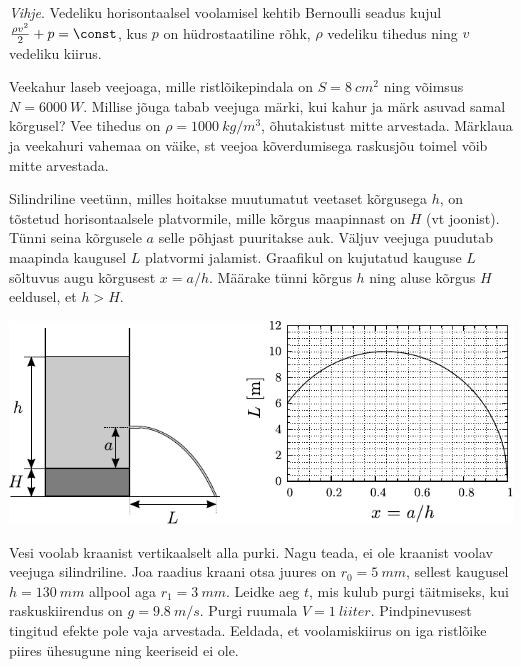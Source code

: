 \documentclass[10pt, twoside]{article}
\begin{document}
{\emph{Vihje}. 
Vedeliku horisontaalsel voolamisel kehtib Bernoulli seadus kujul $\frac{\rho v^2}{2}+p=\const$, kus $p$ on hüdrostaatiline rõhk, $\rho$ vedeliku tihedus ning $v$ vedeliku kiirus.
\probend
\bigskip


Veekahur laseb veejoaga, mille ristlõikepindala on $S = \SI{8}{cm^2}$ ning võimsus $N = \SI{6000}{W}$. Millise jõuga tabab veejuga märki, kui kahur ja märk asuvad samal kõrgusel? Vee tihedus on $\rho = \SI{1000}{kg/m^3}$, õhutakistust mitte arvestada. Märklaua ja veekahuri vahemaa on väike, st veejoa kõverdumisega raskusjõu toimel võib mitte arvestada.
\probend
\bigskip


Silindriline veetünn, milles hoitakse muutumatut veetaset kõrgusega $h$, on tõstetud horisontaalsele platvormile, mille kõrgus maapinnast on $H$ (vt joonist). Tünni seina kõrgusele $a$ selle põhjast puuritakse auk. Väljuv veejuga puudutab maapinda kaugusel $L$ platvormi jalamist. Graafikul on kujutatud kauguse $L$ sõltuvus augu kõrgusest $x = a/h$. Määrake tünni kõrgus $h$ ning aluse kõrgus $H$ eeldusel, et $h > H$.

\begin{center}
	\includegraphics[width=\linewidth]{2005-v3g-05-yl}
\end{center}
\probend
\bigskip


Vesi voolab kraanist vertikaalselt alla purki. Nagu teada, ei ole kraanist voolav veejuga silindriline. Joa raadius kraani otsa juures on $r_0 = \SI{5}{mm}$, sellest kaugusel $h = \SI{130}{mm}$ allpool aga $r_1 = \SI{3}{mm}$. Leidke aeg $t$, mis kulub purgi täitmiseks, kui raskuskiirendus on $g = \SI{9,8}{m/s}$. Purgi ruumala $V = \SI{1}{liiter}$. Pindpinevusest tingitud efekte pole vaja arvestada. Eeldada, et voolamiskiirus on iga ristlõike piires ühesugune ning keeriseid ei ole.
\probend
\bigskip

}
\end{document}
